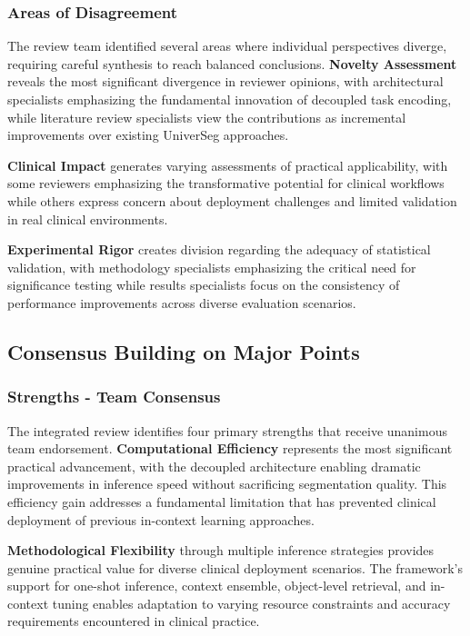 \subsubsection{Areas of Disagreement}
The review team identified several areas where individual perspectives diverge, requiring careful synthesis to reach balanced conclusions. \textbf{Novelty Assessment} reveals the most significant divergence in reviewer opinions, with architectural specialists emphasizing the fundamental innovation of decoupled task encoding, while literature review specialists view the contributions as incremental improvements over existing UniverSeg approaches.

\textbf{Clinical Impact} generates varying assessments of practical applicability, with some reviewers emphasizing the transformative potential for clinical workflows while others express concern about deployment challenges and limited validation in real clinical environments.

\textbf{Experimental Rigor} creates division regarding the adequacy of statistical validation, with methodology specialists emphasizing the critical need for significance testing while results specialists focus on the consistency of performance improvements across diverse evaluation scenarios.

\subsection{Consensus Building on Major Points}
\subsubsection{Strengths - Team Consensus}
The integrated review identifies four primary strengths that receive unanimous team endorsement. \textbf{Computational Efficiency} represents the most significant practical advancement, with the decoupled architecture enabling dramatic improvements in inference speed without sacrificing segmentation quality. This efficiency gain addresses a fundamental limitation that has prevented clinical deployment of previous in-context learning approaches.

\textbf{Methodological Flexibility} through multiple inference strategies provides genuine practical value for diverse clinical deployment scenarios. The framework's support for one-shot inference, context ensemble, object-level retrieval, and in-context tuning enables adaptation to varying resource constraints and accuracy requirements encountered in clinical practice.

